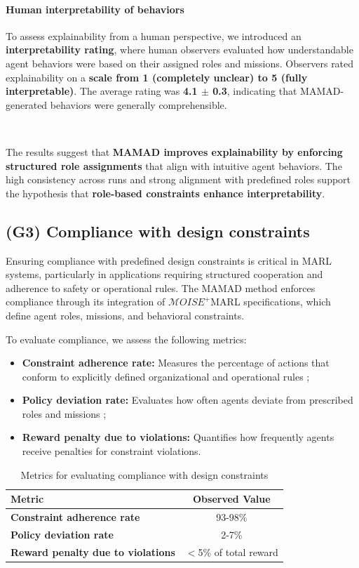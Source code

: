 \documentclass[journal]{IEEEtai}
\begin{document}
\paragraph{Human interpretability of behaviors}
To assess explainability from a human perspective, we introduced an \textbf{interpretability rating}, where human observers evaluated how understandable agent behaviors were based on their assigned roles and missions. Observers rated explainability on a \textbf{scale from 1 (completely unclear) to 5 (fully interpretable)}. The average rating was \textbf{4.1 $\pm$ 0.3}, indicating that MAMAD-generated behaviors were generally comprehensible.

\

The results suggest that \textbf{MAMAD improves explainability by enforcing structured role assignments} that align with intuitive agent behaviors. The high consistency across runs and strong alignment with predefined roles support the hypothesis that \textbf{role-based constraints enhance interpretability}.


\subsection{(G3) Compliance with design constraints}

Ensuring compliance with predefined design constraints is critical in MARL systems, particularly in applications requiring structured cooperation and adherence to safety or operational rules. The MAMAD method enforces compliance through its integration of $\mathcal{M}OISE^+$MARL specifications, which define agent roles, missions, and behavioral constraints. 

To evaluate compliance, we assess the following metrics:

\begin{itemize}
    \item \textbf{Constraint adherence rate:} Measures the percentage of actions that conform to explicitly defined organizational and operational rules ;
    \item \textbf{Policy deviation rate:} Evaluates how often agents deviate from prescribed roles and missions ;
    \item \textbf{Reward penalty due to violations:} Quantifies how frequently agents receive penalties for constraint violations.
\end{itemize}

\begin{table}[h!]
    \centering
    \caption{Metrics for evaluating compliance with design constraints}
    \begin{tabular}{|l|c|}
        \hline
        \textbf{Metric} & \textbf{Observed Value} \\
        \hline
        \textbf{Constraint adherence rate} & 93-98\% \\
        \hline
        \textbf{Policy deviation rate} & 2-7\% \\
        \hline
        \textbf{Reward penalty due to violations} & $<$5\% of total reward \\
        \hline
    \end{tabular}
    \label{tab:compliance}
\end{table}
\end{document}
